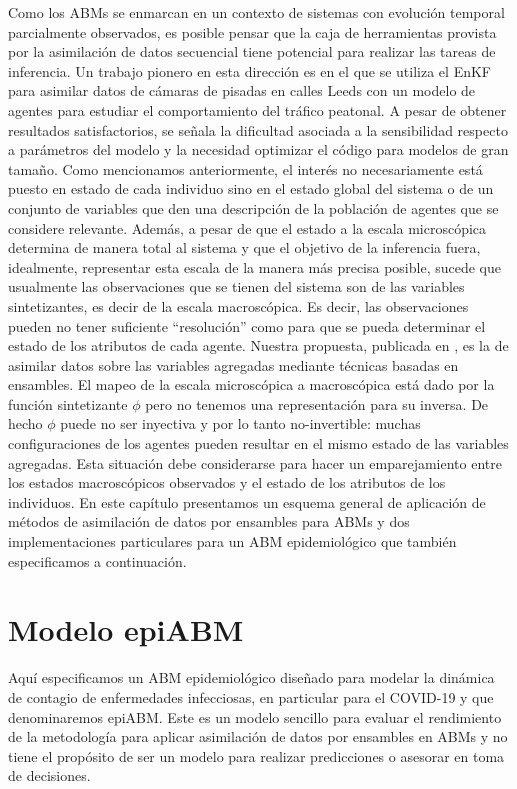 Como los ABMs se enmarcan en un contexto de sistemas con evolución temporal parcialmente observados, es posible pensar que la caja de herramientas provista por la asimilación de datos secuencial tiene potencial para realizar las tareas de inferencia. Un trabajo pionero en esta dirección es \cite{Ward2016} en el que se utiliza el EnKF para asimilar datos de cámaras de pisadas en calles Leeds con un modelo de agentes para estudiar el comportamiento del tráfico peatonal. A pesar de obtener resultados satisfactorios, se señala la dificultad asociada a la sensibilidad respecto a parámetros del modelo y la necesidad optimizar el código para modelos de gran tamaño. Como mencionamos anteriormente, el interés no necesariamente está puesto en estado de cada individuo sino en el estado global del sistema o de un conjunto de variables que den una descripción de la población de agentes que se considere relevante. Además, a pesar de que el estado a la escala microscópica determina de manera total al sistema y que el objetivo de la inferencia fuera, idealmente, representar esta escala de la manera más precisa posible, sucede que usualmente las observaciones que se tienen del sistema son de las variables sintetizantes, es decir de la escala macroscópica. Es decir, las observaciones pueden no tener suficiente ``resolución'' como para que se pueda determinar el estado de los atributos de cada agente. Nuestra propuesta, publicada en \cite{Cocucci2022}, es la de asimilar datos sobre las variables agregadas mediante técnicas basadas en ensambles. El mapeo de la escala microscópica a macroscópica está dado por la función sintetizante $\phi$ pero no tenemos una representación para su inversa. De hecho $\phi$ puede no ser inyectiva y por lo tanto no-invertible: muchas configuraciones de los agentes pueden resultar en el mismo estado de las variables agregadas. Esta situación debe considerarse para hacer un emparejamiento entre los estados macroscópicos observados y el estado de los atributos de los individuos. En este capítulo presentamos un esquema general de aplicación de métodos de asimilación de datos por ensambles para ABMs y dos implementaciones particulares para un ABM epidemiológico que también especificamos a continuación.

\section{Modelo epiABM} \label{sec:epi_abm}

Aquí especificamos un ABM epidemiológico diseñado para modelar la dinámica de contagio de enfermedades infecciosas, en particular para el COVID-19 y que denominaremos epiABM. Este es un modelo sencillo para evaluar el rendimiento de la metodología para aplicar asimilación de datos por ensambles en ABMs y no tiene el propósito de ser un modelo para realizar predicciones o asesorar en toma de decisiones.

